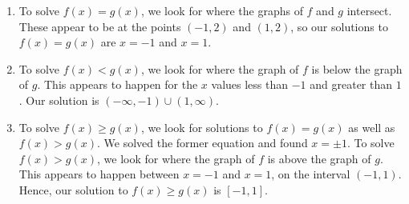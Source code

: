 {
\begin{enumerate}

\item To solve $f(x)=g(x)$, we look for where the graphs of $f$ and $g$ intersect.  These appear to be at the points $(-1,2)$ and $(1,2)$, so our solutions to $f(x) = g(x)$ are $x = -1$ and $x=1$.

\item  To solve $f(x) < g(x)$, we look for where the graph of $f$ is below the graph of $g$.  This appears to happen for the $x$ values less than $-1$ and greater than $1$.  Our solution is $(-\infty, -1) \cup (1,\infty)$.

\item  To solve $f(x) \geq g(x)$, we look for solutions to $f(x)=g(x)$ as well as $f(x) > g(x)$.  We solved the former equation and found $x = \pm 1$.  To solve $f(x) > g(x)$, we look for where the graph of $f$ is above the graph of $g$.  This appears to happen between $x=-1$ and $x=1$, on the interval $(-1,1)$. Hence, our solution to $f(x) \geq g(x)$ is $[-1,1]$. 




\end{enumerate}
}

\medskip

